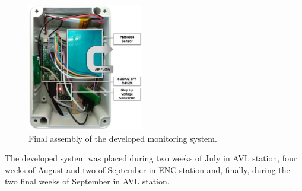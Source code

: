 \begin{figure}[ht]
\centering
\includegraphics[width=0.45\textwidth]{./Images/circuit-final.jpg}
\caption{Final assembly of the developed monitoring system.}
\label{fig:circuit-final}
\end{figure}

The developed system was placed during two weeks of July in AVL station, four weeks of August and two of September in ENC station and, finally, during the two final weeks of September in AVL station.







